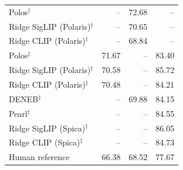 \begin{tabular}{lrrr}
Polos$^{\dagger}$ & -- & 72.68 & -- \\
Ridge SigLIP (Polaris)$^{\dagger}$ & -- & 70.65 & -- \\
Ridge CLIP (Polaris)$^{\dagger}$ & -- & 68.84 & -- \\
\addlinespace
Polos$^{\ddagger}$ & 71.67 & -- & 83.40 \\
Ridge SigLIP (Polaris)$^{\ddagger}$ & 70.58 & -- & 85.72 \\
Ridge CLIP (Polaris)$^{\ddagger}$ & 70.48 & -- & 84.21 \\
DENEB$^{\ddagger}$ & -- & 69.88 & 84.15 \\
Pearl$^{\ddagger}$ & -- & -- & 84.55 \\
Ridge SigLIP (Spica)$^{\ddagger}$ & -- & -- & 86.05 \\
Ridge CLIP (Spica)$^{\ddagger}$ & -- & -- & 84.73 \\
\midrule
Human reference & 66.38 & 68.52 & 77.67 \\
\bottomrule
\end{tabular}
